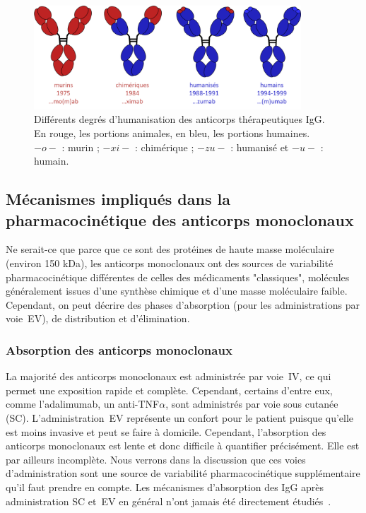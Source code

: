 \begin{figure}[htbp]
	\centering
		\includegraphics[width=10cm]{figures/raster/FIG_12}
	\caption[Différents degrés d'humanisation des anticorps thérapeutiques IgG.]{Différents degrés d'humanisation des anticorps thérapeutiques IgG. En rouge, les portions animales, en bleu, les portions humaines. $-o-$ : murin ; $-xi-$ : chimérique ; $-zu-$ : humanisé et $-u-$ : humain.}
	\label{fig:12}
\end{figure}

\subsection{Mécanismes impliqués dans la pharmacocinétique des anticorps monoclonaux}
Ne serait-ce que parce que ce sont des protéines de haute masse moléculaire (environ 150 kDa), les anticorps monoclonaux ont des sources de variabilité pharmacocinétique différentes de celles des médicaments "classiques", molécules généralement issues d'une synthèse chimique et d'une masse moléculaire faible. Cependant, on peut décrire des phases d'absorption (pour les administrations par voie~\gls{EV}), de distribution et d'élimination.

\subsubsection{Absorption des anticorps monoclonaux}
La majorité des anticorps monoclonaux est administrée par voie~\gls{IV}, ce qui permet une exposition rapide et complète. Cependant, certains d'entre eux, comme l'adalimumab, un anti-TNF$\alpha$, sont administrés par voie sous cutanée (SC). L'administration~\gls{EV} représente un confort pour le patient puisque qu'elle est moins invasive et peut se faire à domicile. Cependant, l'absorption des anticorps monoclonaux est lente et donc difficile à quantifier précisément. Elle est par ailleurs incomplète. Nous verrons dans la discussion que ces voies d'administration sont une source de variabilité pharmacocinétique supplémentaire qu'il faut prendre en compte. Les mécanismes d'absorption des IgG après administration SC et~\gls{EV} en général n'ont jamais été directement étudiés~\citep{REF18}. 

